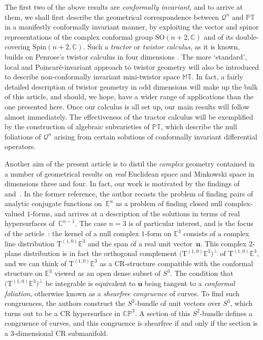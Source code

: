 \documentclass[pdftex]{sigma}
\numberwithin{equation}{section}
\newcommand{\mc} [1]{\mathcal{#1}}
\newcommand{\Spin} {\mathrm{Spin}}
\newcommand{\SO} {\mathrm{SO}}
\newcommand{\Tgt} {\mathrm{T}}
\newcommand{\PT} {\mathbb{PT}}
\newcommand{\T} {\mathbb{T}}
\newcommand{\E} {\mathbb{E}}
\newcommand{\M} {\mathbb{M}}
\newcommand{\CP} {\mathbb{CP}}
\newcommand{\C} {\mathbb{C}}
\begin{document}
The f\/irst two of the above results are \emph{conformally invariant}, and to arrive at them, we shall f\/irst describe the geometrical correspondence between $\mc{Q}^n$ and $\PT$ in a manifestly conformally invariant manner, by exploiting the vector and spinor representations of the complex conformal group $\SO(n+2,\C)$ and of its double-covering $\Spin(n+2,\C)$. Such a \emph{tractor} or \emph{twistor calculus}, as it is known, builds on Penrose's twistor calculus in four dimensions \cite{Penrose1967}. The more `standard', local and Poincar\'{e}-invariant approach to twistor geometry will also be introduced to describe non-conformally invariant mini-twistor space $\M\T$. In fact, a fairly detailed description of twistor geometry in odd dimensions will make up the bulk of this article, and should, we hope, have a wider range of applications than the one presented here. Once our calculus is all set up, our main results will follow almost immediately. The ef\/fectiveness of the tractor calculus will be exemplif\/ied by the construction of algebraic subvarieties of $\PT$, which describe the null foliations of $\mc{Q}^n$ arising from certain solutions of conformally invariant dif\/ferential operators.

Another aim of the present article is to distil the \emph{complex} geometry contained in a number of geometrical results on \emph{real} Euclidean space and Minkowski space in dimensions three and four. In fact, our work is motivated by the f\/indings of~\cite{Nurowski2010} and~\cite{Baird2013}. In the former reference, the author recasts the problem of f\/inding pairs of analytic conjugate functions on~$\E^n$ as a problem of f\/inding closed null complex-valued $1$-forms, and arrives at a description of the solutions in terms of real hypersurfaces of~$\C^{n-1}$. The case $n=3$ is of particular interest, and is the focus of the article~\cite{Baird2013}: the kernel of a null complex $1$-form on $\E^3$ consists of a complex line distribution $\Tgt^{(1,0)} \E^3$ and the span of a real unit vector~$\bm{u}$. This complex $2$-plane distribution is in fact the orthogonal complement $\big(\Tgt^{(1,0)} \E^3\big)^\perp$ of $\Tgt^{(1,0)} \E^3$, and we can think of $\Tgt^{(1,0)} \E^3 $ as a CR-structure compatible with the conformal structure on $\E^3$ viewed as an open dense subset of $S^3$. The condition that $\big(\Tgt^{(1,0)} \E^3\big)^\perp$ be integrable is equivalent to $\bm{u}$ being tangent to a \emph{conformal foliation}, otherwise known as a \emph{shearfree congruence} of curves. To f\/ind such congruences, the authors construct the $S^2$-bundle of unit vectors over $S^3$, which turns out to be a CR hypersurface in $\CP^3$. A section of this $S^2$-bundle def\/ines a congruence of curves, and this congruence is shearfree if and only if the section is a $3$-dimensional CR submanifold.
\end{document}
